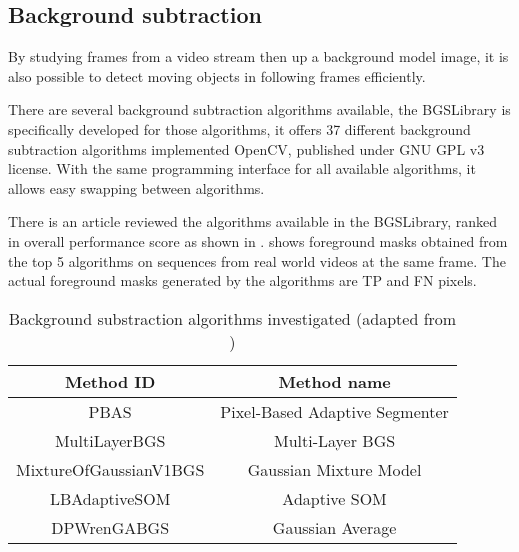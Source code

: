 \subsection{Background subtraction}
\label{motion_bs}

By studying frames from a video stream then  up a background model image, it is also possible to detect moving objects in following frames efficiently.





There are several background subtraction algorithms available, the BGSLibrary \cite{bgslibrary} is specifically developed for  those algorithms, it offers 37 different background subtraction algorithms implemented  OpenCV, published under GNU GPL v3 license. With the same programming interface for all available algorithms, it allows easy swapping between algorithms.

There is an article \cite{bgs:article} reviewed the algorithms available in the BGSLibrary, ranked  in overall performance score as shown in .  shows foreground masks obtained from the top 5 algorithms on sequences from real world videos at the same frame.  The actual foreground masks generated by the algorithms are TP and FN pixels.

\begin{table}[H]
  \centering
  \begin{tabular}{cc}
  \toprule
  \textbf{Method ID} & \textbf{Method name}\\
  \midrule
  PBAS & Pixel-Based Adaptive Segmenter \\
  MultiLayerBGS & Multi-Layer BGS \\
  MixtureOfGaussianV1BGS & Gaussian Mixture Model \\
  LBAdaptiveSOM & Adaptive SOM \\
  DPWrenGABGS & Gaussian Average \\
  \bottomrule
  \end{tabular}
  \caption{Background substraction algorithms investigated (adapted from \cite{bgslibrary})}
  \label{Table:bgs}
\end{table}

